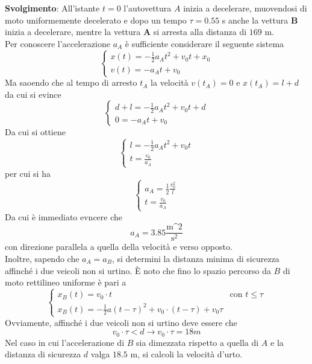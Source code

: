 \documentclass[a4paper]{extarticle}
\begin{document}
\vspace{1em}
\noindent
\textbf{Svolgimento}: All'istante $t=0$ l'autovettura $A$ inizia a decelerare, muovendosi di moto uniformemente decelerato e dopo un tempo $\tau = 0.55$ s anche la vettura $\boldsymbol{B}$ inizia a decelerare, mentre la vettura $\boldsymbol{A}$ si arresta alla distanza di $169$ m.\\
Per conoscere l'accelerazione $a_A$ è sufficiente considerare il seguente sistema
\[
  \left\{
    \begin{array}{l}
      x(t) = -\frac{1}{2} a_A t^2 + v_0 t + x_0\\
      v(t) = -a_A t + v_0
    \end{array}
  \right.
\]
Ma saoendo che al tempo di arresto $t_A$ la velocità $v(t_A) = 0$ e $x(t_A) = l + d$ da cui si evince
\[
  \left\{
    \begin{array}{l}
      d + l = -\frac{1}{2} a_A t^2 + v_0 t + d\\
      0 = -a_A t + v_0
    \end{array}
  \right.
\]
Da cui si ottiene
\[
  \left\{
    \begin{array}{l}
      l = -\frac{1}{2} a_A t^2 + v_0 t\\
      t = \frac{v_0}{a_A}
    \end{array}
  \right.
\]
per cui si ha
\[
  \left\{
    \begin{array}{l}
      a_A = \frac{1}{2} \frac{v_0^2}{l}\\
      t = \frac{v_0}{a_A}
    \end{array}
  \right.
\]
Da cui è immediato evncere che
\[a_A = 3.85 \frac{\text{m^2}}{\text{s}^2}\]
con direzione parallela a quella della velocità e verso opposto.\\
Inoltre, sapendo che $a_A = a_B$, si determini la distanza minima di sicurezza affinché i due veicoli non si urtino. È noto che fino lo spazio percorso da $B$ di moto rettilineo uniforme è pari a
\[
  \left\{
    \begin{array}{ll}
      x_B(t) = v_0 \cdot t & \text{con } t \leq \tau\\
      x_B(t) = -\frac{1}{2} a (t - \tau)^2 + v_0 \cdot (t - \tau) + v_0 \tau
    \end{array}
  \right.
\]
Ovviamente, affinché i due veicoli non si urtino deve essere che
\[v_0 \cdot \tau < d \longrightarrow v_0 \cdot \tau = 18 m\]
Nel caso in cui l'accelerazione di $B$ sia dimezzata rispetto a quella di $A$ e la distanza di sicurezza $d$ valga $18.5$ m, si calcoli la velocità d'urto.\\
\end{document}
